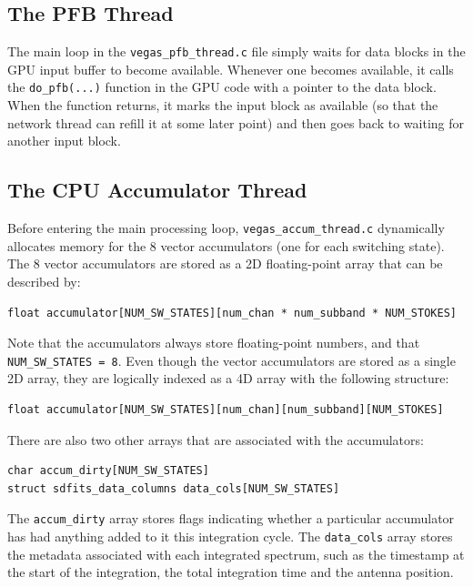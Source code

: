 \documentclass[11pt]{article} %
\begin{document}
\subsection{The PFB Thread}

The main loop in the \texttt{vegas\_pfb\_thread.c} file simply waits for data blocks in the GPU input buffer to become available. Whenever one becomes available, it calls the \texttt{do\_pfb(...)} function in the GPU code with a pointer to the data block. When the function returns, it marks the input block as available (so that the network thread can refill it at some later point) and then goes back to waiting for another input block.

\subsection{The CPU Accumulator Thread}

Before entering the main processing loop, \texttt{vegas\_accum\_thread.c} dynamically allocates memory for the 8 vector accumulators (one for each switching state). The 8 vector accumulators are stored as a 2D floating-point array that can be described by:
\begin{verbatim}
float accumulator[NUM_SW_STATES][num_chan * num_subband * NUM_STOKES]
\end{verbatim}

Note that the accumulators always store floating-point numbers, and that \texttt{NUM\_SW\_STATES~=~8}. Even though the vector accumulators are stored as a single 2D array, they are logically indexed as a 4D array with the following structure:

\begin{verbatim}
float accumulator[NUM_SW_STATES][num_chan][num_subband][NUM_STOKES]
\end{verbatim}

There are also two other arrays that are associated with the accumulators:
\begin{verbatim}
char accum_dirty[NUM_SW_STATES]
struct sdfits_data_columns data_cols[NUM_SW_STATES]
\end{verbatim}

The \texttt{accum\_dirty} array stores flags indicating whether a particular accumulator has had anything added to it this integration cycle. The \texttt{data\_cols} array stores the metadata associated with each integrated spectrum, such as the timestamp at the start of the integration, the total integration time and the antenna position.
\end{document}
